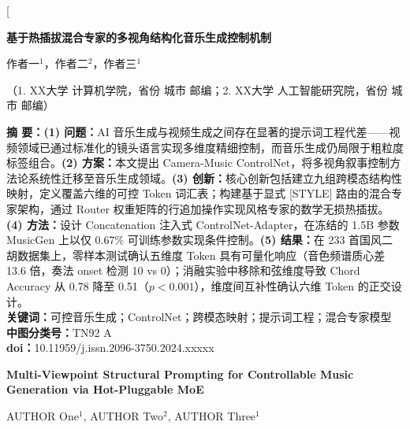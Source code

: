 \documentclass[twocolumn, a4paper, 10pt]{ctexart}
\begin{document}
\twocolumn[
\begin{center}
    \vspace*{-1cm}
    { \sffamily \bfseries 基于热插拔混合专家的多视角结构化音乐生成控制机制\par}
    \vspace{4mm}
    
    { 作者一$^1$，作者二$^2$，作者三$^1$\par}
    \vspace{2mm}
    
    { （1. XX大学 计算机学院，省份 城市 邮编；2. XX大学 人工智能研究院，省份 城市 邮编）\par}
    \vspace{6mm}
    
    \parbox{0.9\textwidth}{
        {\bfseries 摘 要：}{\textbf{(1) 问题：}}AI 音乐生成与视频生成之间存在显著的提示词工程代差——视频领域已通过标准化的镜头语言实现多维度精细控制，而音乐生成仍局限于粗粒度标签组合。{\textbf{(2) 方案：}}本文提出 Camera-Music ControlNet，将多视角叙事控制方法论系统性迁移至音乐生成领域。{\textbf{(3) 创新：}}核心创新包括建立九组跨模态结构性映射，定义覆盖六维的可控 Token 词汇表；构建基于显式 [STYLE] 路由的混合专家架构，通过 Router 权重矩阵的行追加操作实现风格专家的数学无损热插拔。{\textbf{(4) 方法：}}设计 Concatenation 注入式 ControlNet-Adapter，在冻结的 1.5B 参数 MusicGen 上以仅 0.67\% 可训练参数实现条件控制。{\textbf{(5) 结果：}}在 233 首国风二胡数据集上，零样本测试确认五维度 Token 具有可量化响应（音色频谱质心差 13.6 倍，奏法 onset 检测 10 vs 0）；消融实验中移除和弦维度导致 Chord Accuracy 从 0.78 降至 0.51（$p < 0.001$），维度间互补性确认六维 Token 的正交设计。\\
        {\bfseries 关键词：}可控音乐生成；ControlNet；跨模态映射；提示词工程；混合专家模型\\
        {\bfseries 中图分类号：}TN92 A \\
        {\bfseries doi：}10.11959/j.issn.2096-3750.2024.xxxxx
    }
    \vspace{8mm}

    { \bfseries Multi-Viewpoint Structural Prompting for Controllable Music Generation via Hot-Pluggable MoE\par}
    \vspace{4mm}
    
    { AUTHOR One$^1$, AUTHOR Two$^2$, AUTHOR Three$^1$\par}
    \vspace{2mm}
    

\end{center}
\end{document}

